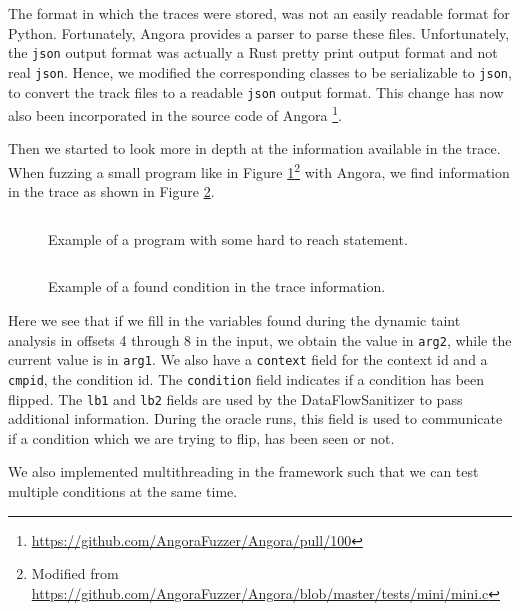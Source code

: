 The format in which the traces were stored, was not an easily readable format for Python. Fortunately, Angora provides a parser to parse these files. Unfortunately, the \texttt{json} output format was actually a Rust pretty print output format and not real \texttt{json}. Hence, we modified the corresponding classes to be serializable to \texttt{json}, to convert the track files to a readable \texttt{json} output format. This change has now also been incorporated in the source code of Angora \footnote{\url{https://github.com/AngoraFuzzer/Angora/pull/100}}.

Then we started to look more in depth at the information available in the trace.
When fuzzing a small program like in Figure \ref{fig:mini-code}\footnote{Modified from \url{https://github.com/AngoraFuzzer/Angora/blob/master/tests/mini/mini.c}} with Angora, we find information in the trace as shown in Figure \ref{fig:mini-trace}.

\begin{figure}[H]
    \centering
    \inputminted{C}{code/mini.c}
    \caption{Example of a program with some hard to reach statement.}
    \label{fig:mini-code}
\end{figure}

\begin{figure}[H]
    \centering
    \inputminted{JSON}{code/trace.json}
    \caption{Example of a found condition in the trace information.}
    \label{fig:mini-trace}
\end{figure}


Here we see that if we fill in the variables found during the dynamic taint analysis in offsets 4 through 8 in the input, we obtain the value in \texttt{arg2}, while the current value is in \texttt{arg1}. We also have a \texttt{context} field for the context id and a \texttt{cmpid}, the condition id. The \texttt{condition} field indicates if a condition has been flipped. The \texttt{lb1} and \texttt{lb2} fields are used by the DataFlowSanitizer \cite{dataflowsanitizer} to pass additional information. During the oracle runs, this field is used to communicate if a condition which we are trying to flip, has been seen or not.

We also implemented multithreading in the framework such that we can test multiple conditions at the same time.



